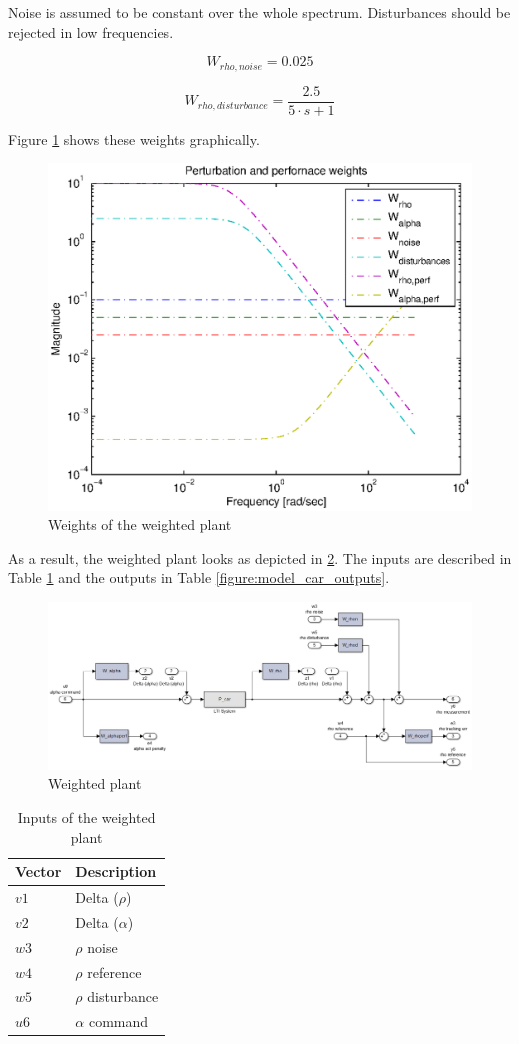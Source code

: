 \documentclass[conference]{IEEEtran}
\begin{document}
Noise is assumed to be constant over the whole spectrum. Disturbances should be rejected in low frequencies.

\begin{equation}
{W_{rho,noise}} = 0.025
\end{equation}

\begin{equation}
{W_{rho,disturbance}} = \frac{{2.5}}{{5 \cdot s + 1}}
\end{equation}

Figure \ref{figure:weights} shows these weights graphically.

\begin{figure}[h]
\centering
  \includegraphics[width=.47\textwidth]{pics/weights.eps} 
  \caption{Weights of the weighted plant}  
  \label{figure:weights}
\end{figure}

As a result, the weighted plant looks as depicted in \ref{figure:model_car}. The inputs are described in Table \ref{figure:model_car_inputs} and the outputs in Table \ref{figure:model_car_outputs}.

\begin{figure}[h]
\centering
  \includegraphics[width=.47\textwidth]{pics/model_car.png} 
  \caption{Weighted plant}  
  \label{figure:model_car}
\end{figure}


\begin{table}[h]
\begin{center}
\begin{tabular}{|l||l|}
\hline
Vector 		& Description 		\\
\hline
$v1$ 		& Delta ($\rho$) 	\\
\hline
$v2$		& Delta ($\alpha$) 	\\
\hline
\hline
$w3$		& $\rho$ noise 		\\
\hline
$w4$		& $\rho$ reference	\\
\hline
$w5$		& $\rho$ disturbance 		\\
\hline
\hline
$u6$		& $\alpha$ command	\\
\hline
\end{tabular}
\caption{Inputs of the weighted plant}  
\label{figure:model_car_inputs}
\end{center}
\end{table}
\end{document}
